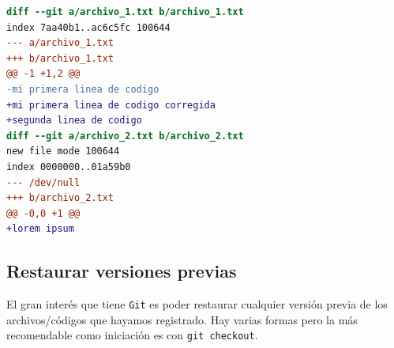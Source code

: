 \documentclass[a5paper, oneside,10pt]{article}
\begin{document}
\begin{enumerate}
\begin{itemize}
      \begin{lstlisting}[language=diff]
diff --git a/archivo_1.txt b/archivo_1.txt
index 7aa40b1..ac6c5fc 100644
--- a/archivo_1.txt
+++ b/archivo_1.txt
@@ -1 +1,2 @@
-mi primera linea de codigo
+mi primera linea de codigo corregida
+segunda linea de codigo
diff --git a/archivo_2.txt b/archivo_2.txt
new file mode 100644
index 0000000..01a59b0
--- /dev/null
+++ b/archivo_2.txt
@@ -0,0 +1 @@
+lorem ipsum

      \end{lstlisting}
      
    \end{itemize}
    \end{enumerate}
  \subsection{Restaurar versiones previas}
    El gran interés que tiene \verb+Git+ es poder restaurar cualquier versión previa de los archivos/códigos que hayamos registrado. Hay varias formas pero la más recomendable como iniciación es con \verb+git checkout+.
    
\end{document}
